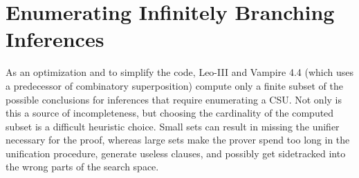 \documentclass[smallcondensed,draft]{svjour3}     %
\begin{document}

\section{Enumerating Infinitely Branching Inferences}
\label{sec:satfol:ho-tech:infinite-branching}

As an optimization and to simplify the code, Leo-III
\cite{as-18-phd} and Vampire 4.4 \cite{br-19-restricted-unif} (which uses
a predecessor of combinatory
superposition) compute only a finite subset of the possible conclusions for
inferences that require enumerating a CSU. Not only is this a source of
incompleteness, but choosing the cardinality of the computed subset is a
difficult heuristic choice. Small sets can result in missing the unifier
necessary for the proof, whereas large sets make the prover spend too long in
the unification procedure, generate useless clauses, and possibly get sidetracked into the wrong parts of the search space.
\end{document}
